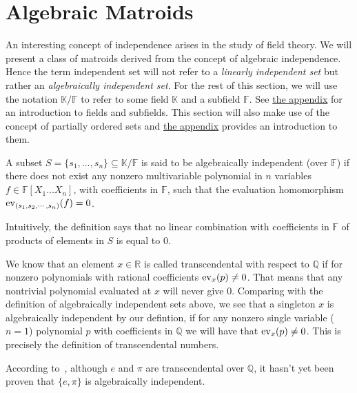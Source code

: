 \newpage

\section{Algebraic Matroids}\label{sec:algebraic-matroids}

An interesting concept of independence arises in the study of field theory.  We will present a class of matroids derived from the concept of algebraic independence. Hence the term independent set will not refer to a \textit{linearly independent set} but rather an \textit{algebraically independent set}. For the rest of this section, we will use the notation $\mathbb K / \mathbb F$ to refer to some field $\mathbb K$ and a subfield $\mathbb F$. See \hyperref[sec:appendix-fields]{the appendix} for an introduction to fields and subfields. This section will also make use of the concept of partially ordered sets and  \hyperref[sec:appendix-poset]{the appendix} provides an introduction to them.

\begin{defn}
	A subset $S = \{ s_1 ,\ldots, s _n \} \subseteq \mathbb K / \mathbb F$ is said to be algebraically independent (over $\mathbb F$) if there does not exist any
	nonzero multivariable polynomial in $n$ variables $f \in \mathbb{F}[X _1 \ldots X _n]$, with coefficients in $\mathbb{F} $, such that the evaluation homomorphism $\mathrm{ev}_{(s_1, s_2,\cdots,s_n)}(f) = 0$.
\end{defn}
Intuitively, the definition says that no linear combination with coefficients in $\mathbb F$ of products of elements in $S$ is equal to $0$.

We know that an element $x\in \mathbb{R}$ is called transcendental with respect to $\mathbb{Q}$ if for nonzero polynomials with rational coefficients $\mathrm{ev}_{x}(p) \neq 0$. That means that any nontrivial polynomial evaluated at $x$ will never give 0.
Comparing with the definition of algebraically independent sets above, we see that a singleton ${x}$ is algebraically independent by our defintion, if for any nonzero  single variable ($n = 1$) polynomial $p$ with coefficients in $\mathbb{Q}$ we will have that $\mathrm{ev}_{x}(p) \neq 0$. This is precisely the definition of transcendental numbers.

\begin{exmp}
According to~\cite[113]{milne2022}, although $e$ and $\pi$ are transcendental over $\mathbb{Q}$, it hasn't yet been proven that $\{e, \pi \}$ is algebraically independent.
\end{exmp}

